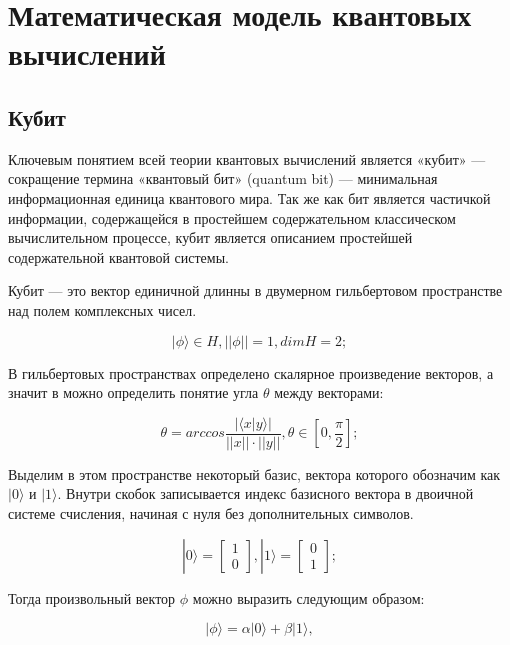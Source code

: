 \documentclass[14pt]{article}
\begin{document}
	
	\newpage
	\section{Математическая модель квантовых вычислений}
	\subsection{Кубит}
	
	Ключевым понятием всей теории квантовых вычислений является «кубит» — сокращение термина «квантовый бит» (quantum bit) — минимальная информационная единица квантового мира. Так же как бит является частичкой информации, содержащейся в простейшем содержательном классическом вычислительном процессе, кубит является описанием простейшей содержательной квантовой системы.
	
Кубит — это вектор единичной длинны в двумерном гильбертовом пространстве над полем комплексных чисел.
	
	\begin{equation}
	|\phi \rangle \in H, ||\phi|| = 1, dimH = 2;	
	\end{equation}
	
	В гильбертовых пространствах определено скалярное произведение векторов, а значит в можно определить понятие угла $\theta$ между векторами:

	\begin{equation}
	\theta = arccos \frac{ | \langle x|y \rangle | }{||x|| \cdot ||y||}, \theta \in [0, \frac{\pi}{2}];
	\end{equation}

	Выделим в этом пространстве некоторый базис, вектора которого обозначим как $|0 \rangle$ и $|1 \rangle$. Внутри скобок записывается индекс базисного вектора в двоичной системе счисления, начиная с нуля без дополнительных символов.

	\begin{equation}
	|0 \rangle = \begin{bmatrix} 1 \\ 0 \end{bmatrix}, 
	|1 \rangle = \begin{bmatrix} 0 \\ 1 \end{bmatrix};
	\end{equation}

	Тогда произвольный вектор $\phi$ можно выразить следующим образом:
	
	\begin{equation}
	| \phi \rangle = \alpha |0 \rangle + \beta	|1 \rangle,
	\end{equation}
	
\end{document}
